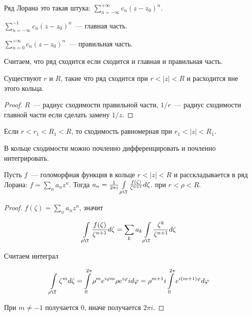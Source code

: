 \begin{definition}
    Ряд Лорана это такая штука:
    $\sum\limits_{n=-\infty}^{+\infty} c_n(z-z_0)^n$.
\end{definition}

\begin{definition}
    $\sum\limits_{n=-\infty}^{-1} c_n(z-z_0)^n$~--- главная часть.
\end{definition}

\begin{definition}
    $\sum\limits_{n=0}^{+\infty} c_n(z-z_0)^n$~--- правильная часть.
\end{definition}

Считаем, что ряд сходится если сходится и главная и правильная часть.

\begin{property}
    Существуют $r$ и $R$, такие что ряд сходится
    при $r < |z| < R$ и расходится вне этого кольца.
\end{property}

\begin{proof}
    $R$~--- радиус сходимости правильной части,
    $1/r$~--- радиус сходимости главной части если сделать
    замену $1/z$.
\end{proof}

\begin{property}
    Если $r < r_1 < R_1 < R$,
    то сходимость равномерная при $r_1 < |z| < R_1$.
\end{property}

\begin{property}
    В кольце сходимости можно почленно дифференцировать
    и почленно интегрировать.
\end{property}

\begin{theorem}
    Пусть $f$~--- голоморфная функция в кольце $r < |z| < R$
    и расскладывается в ряд Лорана: $f = \sum\limits_n a_nz^n$.
    Тогда $a_n = \frac{1}{2\pi i}
        \int\limits_{\rho\T}\frac{f(\zeta)}{\zeta^{n+1}} d\zeta$.
    при $r < \rho < R$.
\end{theorem}

\begin{proof}
    $f(\zeta) = \sum\limits_n a_nz^n$, значит

    \[\int\limits_{\rho\T} \frac{f(\zeta)}{\zeta^{n+1}} d\zeta =
        \sum\limits_k a_k \int\limits_{\rho\T} \frac{\zeta^k}{\zeta^{n+1}} d\zeta\]

    Считаем интеграл

    \[
        \int\limits_{\rho\T} \zeta^m d\zeta = \int\limits_0^{2\pi}
        \rho^m e^{i\varphi m}\rho e^{i\varphi} i d\varphi
        = \rho^{m+1} i \int\limits_0^{2\pi } e^{i(m+1)\varphi} d\varphi
    \]

    При $m \ne -1$ получается $0$, иначе получается $2\pi i$.
\end{proof}


